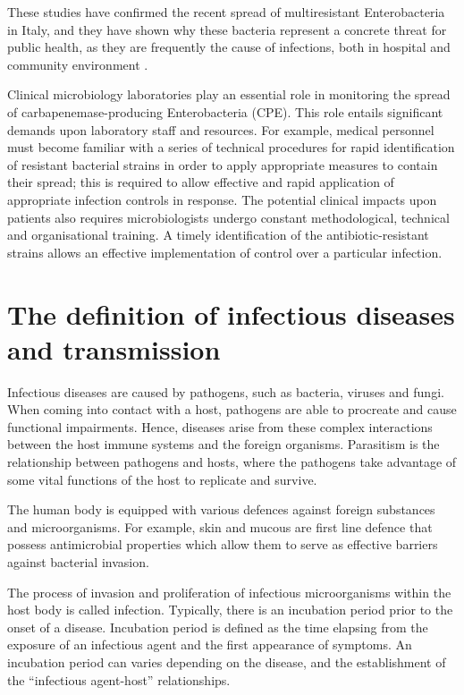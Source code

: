 \documentclass[11pt]{report}
\begin{document}
These studies have confirmed the recent spread of multiresistant Enterobacteria in Italy, and they have shown why these bacteria represent a concrete threat for public health, as they are frequently the cause of infections, both in hospital and community environment \cite{circolare2013}.

Clinical microbiology laboratories play an essential role in monitoring the spread of carbapenemase-producing Enterobacteria (CPE).
This role entails significant demands upon laboratory staff and resources.
For example, medical personnel must become familiar with a series of technical procedures for rapid identification of resistant bacterial strains in order to apply appropriate measures to contain their spread; this is required to allow effective and rapid application of appropriate infection controls in response.
The potential clinical impacts upon patients also requires microbiologists undergo constant methodological, technical and organisational training.
A timely identification of the antibiotic-resistant strains allows an effective implementation of control over a particular infection.

\section{The definition of infectious diseases and transmission}
Infectious diseases are caused by pathogens, such as bacteria, viruses and fungi.
When coming into contact with a host, pathogens are able to procreate and cause functional impairments.
Hence, diseases arise from these complex interactions between the host immune systems and the foreign organisms.
Parasitism is the relationship between pathogens and hosts, where the pathogens take advantage of some vital functions of the host to replicate and survive.

The human body is equipped with various defences against foreign substances and microorganisms.
For example, skin and mucous are first line defence that possess antimicrobial properties which allow them to serve as effective barriers against bacterial invasion.

The process of invasion and proliferation of infectious microorganisms within the host body is called infection.
Typically, there is an incubation period prior to the onset of a disease.
Incubation period is defined as the time elapsing from the exposure of an infectious agent and the first appearance of symptoms.
An incubation period can varies depending on the disease, and the establishment of the ``infectious agent-host'' relationships.
\end{document}
